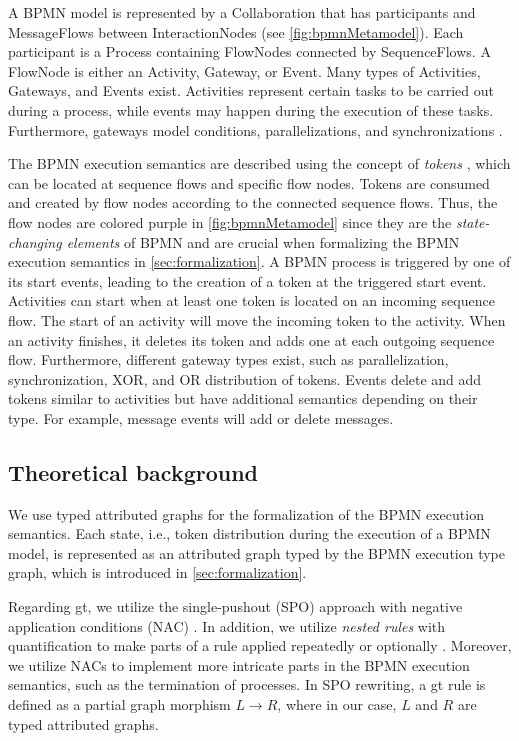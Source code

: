 \documentclass[runningheads]{llncs}
\begin{document}
A BPMN model is represented by a \textsf{Collaboration} that has \textsf{participants} and \textsf{MessageFlows} between \textsf{InteractionNodes} (see  \autoref{fig:bpmnMetamodel}).
Each participant is a \textsf{Process} containing \textsf{FlowNodes} connected by \textsf{SequenceFlows}.
A \textsf{FlowNode} is either an \textsf{Activity}, \textsf{Gateway}, or \textsf{Event}.
Many types of \textsf{Activities}, \textsf{Gateways}, and \textsf{Events} exist.
Activities represent certain tasks to be carried out during a process, while events may happen during the execution of these tasks.
Furthermore, gateways model conditions, parallelizations, and synchronizations \cite{freundRealLifeBPMNUsing2019}.

The BPMN execution semantics are described using the concept of \emph{tokens} \cite{objectmanagementgroupBusinessProcessModel2013}, which can be located at sequence flows and specific flow nodes.
Tokens are consumed and created by flow nodes according to the connected sequence flows.
Thus, the flow nodes are colored purple in \autoref{fig:bpmnMetamodel} since they are the \textit{state-changing elements} of BPMN and are crucial when formalizing the BPMN execution semantics in \autoref{sec:formalization}.
A BPMN process is triggered by one of its start events, leading to the creation of a token at the triggered start event.
Activities can start when at least one token is located on an incoming sequence flow.
The start of an activity will move the incoming token to the activity.
When an activity finishes, it deletes its token and adds one at each outgoing sequence flow.
Furthermore, different gateway types exist, such as parallelization, synchronization, XOR, and OR distribution of tokens.
Events delete and add tokens similar to activities but have additional semantics depending on their type.
For example, message events will add or delete messages.

\subsection{Theoretical background}
We use typed attributed graphs for the formalization of the BPMN execution semantics.
Each state, i.e., token distribution during the execution of a BPMN model, is represented as an attributed graph typed by the BPMN execution type graph, which is introduced in \autoref{sec:formalization}.

Regarding \gls*{gt}, we utilize the single-pushout (SPO) approach with negative application conditions (NAC) \cite{ehrigALGEBRAICAPPROACHESGRAPH1997}.
In addition, we utilize \emph{nested rules} with quantification to make parts of a rule applied repeatedly or optionally \cite{rensinkNestedQuantificationGraph2006,rensinkHowMuchAre2017}.
Moreover, we utilize NACs to implement more intricate parts in the BPMN execution semantics, such as the termination of processes. 
In SPO rewriting, a \gls*{gt} rule is defined as a partial graph morphism $L \to R$, where in our case, $L$ and $R$ are typed attributed graphs. 
\end{document}
